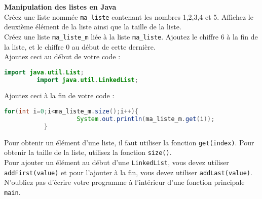 	     
	\begin{Exercice}[10 minutes] \textbf{Manipulation des listes en Java}\\
      	Créez une liste nommée \lstinline{ma_liste} contenant les nombres 1,2,3,4 et 5. Affichez le deuxième élément de la liste ainsi que la taille de la liste. \\
      	
      	Créez une liste \lstinline{ma_liste_m} liée à la liste \lstinline{ma_liste}. Ajoutez le chiffre 6 à la fin de la liste, et le chiffre 0 au début de cette dernière. \\
      	
      	Ajoutez ceci au début de votre code : \\
       
      	\begin{lstlisting}[language=Java]
             import java.util.List;
	     import java.util.LinkedList; \end{lstlisting}
	     
	     Ajoutez ceci à la fin de votre code : \\
	     
	    \begin{lstlisting}[language=Java]
             for(int i=0;i<ma_liste_m.size();i++){
            		System.out.println(ma_liste_m.get(i));
	       } \end{lstlisting} 
    
        \begin{conseil}
            Pour obtenir un élément d'une liste, il faut utiliser la fonction \lstinline{get(index)}. Pour obtenir la taille de la liste, utilisez la fonction \lstinline{size()}. \\
            
            Pour ajouter un élément au début d'une \lstinline{LinkedList}, vous devez utiliser \lstinline{addFirst(value)} et pour l'ajouter à la fin, vous devez utiliser \lstinline{addLast(value)}. \\
            
           	N'oubliez pas d'écrire votre programme à l'intérieur d'une fonction principale \lstinline{main}. \\
           	
           	
		     
        \end{conseil}
        
        \begin{solution}
            
        \end{solution}
    \end{Exercice}
    

